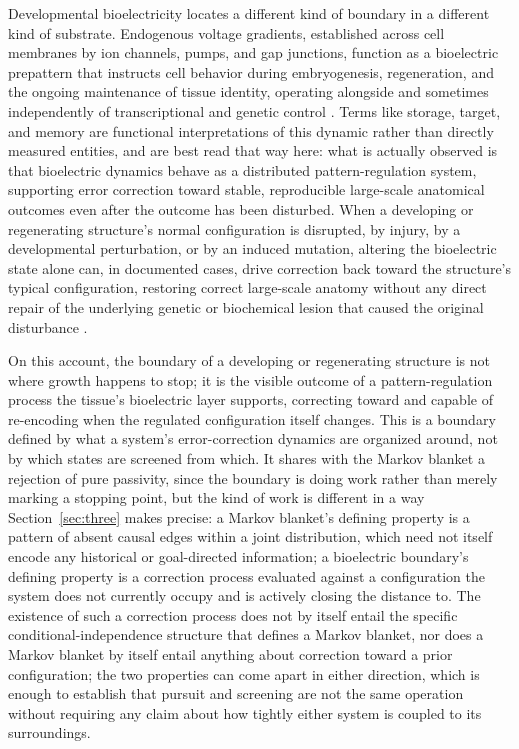 \documentclass[11pt]{article}
\theoremstyle{plain}
\begin{document}
Developmental bioelectricity locates a different kind of boundary in a different kind of substrate. Endogenous voltage gradients, established across cell membranes by ion channels, pumps, and gap junctions, function as a bioelectric prepattern that instructs cell behavior during embryogenesis, regeneration, and the ongoing maintenance of tissue identity, operating alongside and sometimes independently of transcriptional and genetic control \citep{levin2021}. Terms like storage, target, and memory are functional interpretations of this dynamic rather than directly measured entities, and are best read that way here: what is actually observed is that bioelectric dynamics behave as a distributed pattern-regulation system, supporting error correction toward stable, reproducible large-scale anatomical outcomes even after the outcome has been disturbed. When a developing or regenerating structure's normal configuration is disrupted, by injury, by a developmental perturbation, or by an induced mutation, altering the bioelectric state alone can, in documented cases, drive correction back toward the structure's typical configuration, restoring correct large-scale anatomy without any direct repair of the underlying genetic or biochemical lesion that caused the original disturbance \citep{levin2023}.

On this account, the boundary of a developing or regenerating structure is not where growth happens to stop; it is the visible outcome of a pattern-regulation process the tissue's bioelectric layer supports, correcting toward and capable of re-encoding when the regulated configuration itself changes. This is a boundary defined by what a system's error-correction dynamics are organized around, not by which states are screened from which. It shares with the Markov blanket a rejection of pure passivity, since the boundary is doing work rather than merely marking a stopping point, but the kind of work is different in a way Section~\ref{sec:three} makes precise: a Markov blanket's defining property is a pattern of absent causal edges within a joint distribution, which need not itself encode any historical or goal-directed information; a bioelectric boundary's defining property is a correction process evaluated against a configuration the system does not currently occupy and is actively closing the distance to. The existence of such a correction process does not by itself entail the specific conditional-independence structure that defines a Markov blanket, nor does a Markov blanket by itself entail anything about correction toward a prior configuration; the two properties can come apart in either direction, which is enough to establish that pursuit and screening are not the same operation without requiring any claim about how tightly either system is coupled to its surroundings.
\end{document}
